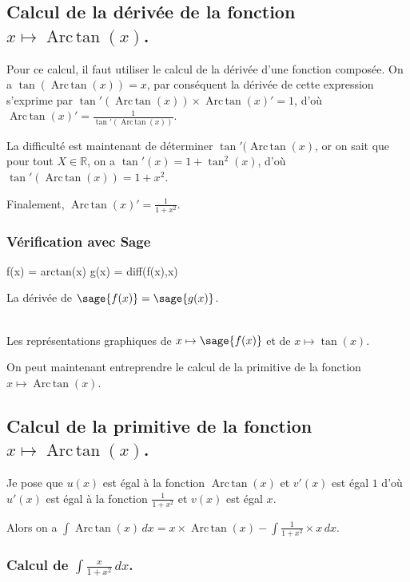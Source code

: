 \documentclass[a4paper,14pt]{extreport} %
\def\eclaire{\mathbb}
\def\R{\ensuremath{\eclaire R}}
\renewcommand{\arctan}{\mathop{\mathrm{Arc\,tan}}}
\begin{document}
\subsection{Calcul de la dérivée de la fonction $x \mapsto \arctan(x) $.}


Pour ce calcul, il faut utiliser le calcul de la dérivée d'une fonction composée. On a $\tan(\arctan(x))=x$, par conséquent la dérivée de cette expression s'exprime par $ \tan'(\arctan(x)) \times \arctan(x)' = 1$, d'où $\arctan(x)' = \frac{1}{\tan'(\arctan(x))} $.

La difficulté est maintenant de déterminer $\tan'(\arctan(x)$, or on sait que pour tout $X \in \R$, on a $ \tan'(x) =1+\tan^2(x) $, d'où $\tan'(\arctan(x)) = 1+x^2$.

Finalement, $\arctan(x)' = \frac{1}{1+x^2}$.

\subsubsection*{Vérification avec Sage}

\begin{sageblock}
    f(x) = arctan(x)
    g(x) = diff(f(x),x)
\end{sageblock}

La dérivée de $\sage{f(x)} = \sage{g(x)} $.


\begin{center}
\\
Les représentations graphiques de $x \mapsto \sage{f(x)} $ et de $x\mapsto \tan(x)$.
\end{center}


On peut maintenant entreprendre le calcul de la primitive de la  fonction  $x \mapsto \arctan(x) $.


\subsection{Calcul de la primitive de la fonction  $x \mapsto \arctan(x) $.}


Je pose que $u(x)$  est égal à la fonction $\arctan(x)$ et $v'(x)$ est égal $1$  d'où $u'(x)$  est égal à la fonction $ \frac{1}{1+ x^2} $ et $v(x)$ est égal $x$.

Alors on a $\int \arctan(x) \, dx = x \times \arctan(x) -\int \frac{1}{1+x^2} \times x \, dx $.

\subsubsection{Calcul de $\int \frac{x}{1+ x^2} \, dx $.}
\end{document}
